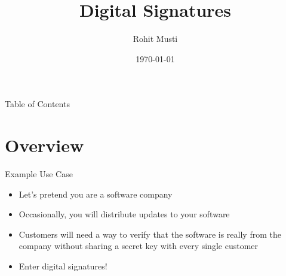 \documentclass[handout]{beamer}
\title{Digital Signatures}
\author{Rohit Musti}
\institute{CUNY - Hunter College}
\date{\today}
\begin{document}
 
\frame{\titlepage}

\begin{frame}{Table of Contents}
  \tableofcontents
\end{frame}


\section{Overview}

\begin{frame}{Example Use Case}
    \begin{itemize}
        \item \pause Let's pretend you are a software company
        \item \pause Occasionally, you will distribute updates to your software
        \item \pause Customers will need a way to verify that the software is really from the company without sharing a secret key with every single customer
        \item \pause Enter digital signatures!
    \end{itemize}
\end{frame}
\end{document}
